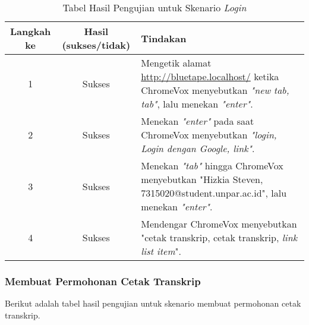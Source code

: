 \begin{table}[H]
    \centering 
    \caption{Tabel Hasil Pengujian untuk Skenario \textit{Login}}
    \label{tab:hasil_pengujian_login}
    \begin{tabular}{|c|c|p{10cm}|}
        \toprule
        Langkah ke & Hasil (sukses/tidak) & Tindakan \\

        \midrule
        1 & Sukses & Mengetik alamat \url{http://bluetape.localhost/} ketika ChromeVox menyebutkan \textit{"new tab, tab"}, lalu menekan \textit{"enter"}. \\
        2 & Sukses & Menekan \textit{"enter"} pada saat ChromeVox menyebutkan \textit{"login, Login dengan Google, link"}. \\
        3 & Sukses & Menekan \textit{"tab"} hingga ChromeVox menyebutkan "Hizkia Steven, 7315020@student.unpar.ac.id", lalu menekan \textit{"enter"}. \\
        4 & Sukses & Mendengar ChromeVox menyebutkan "cetak transkrip, cetak transkrip, \textit{link list item}". \\

        \bottomrule

    \end{tabular}
\end{table}

\subsubsection{Membuat Permohonan Cetak Transkrip}
\label{subsubsec:hasil_pengujian_membuat_permohonan_cetak_transkrip}
Berikut adalah tabel hasil pengujian untuk skenario membuat permohonan cetak transkrip.

